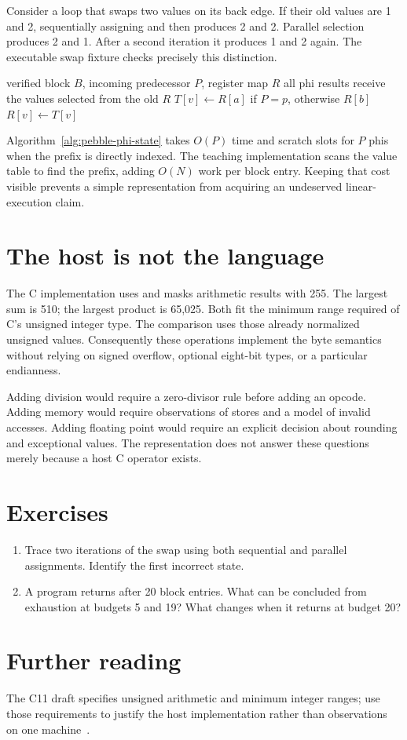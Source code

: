 Consider a loop that swaps two values on its back edge.
If their old values are 1 and 2, sequentially assigning  and then  produces 2 and 2.
Parallel selection produces 2 and 1.
After a second iteration it produces 1 and 2 again.
The executable swap fixture checks precisely this distinction.

\begin{algorithm}[htbp]
\caption{Evaluating a block's phi prefix.}
\label{alg:pebble-phi-state}
\begin{pseudocode}
\Require verified block $B$, incoming predecessor $P$, register map $R$
\Ensure all phi results receive the values selected from the old $R$
\State $T[v]\gets R[a]$ if $P=p$, otherwise $R[b]$
\EndFor
{}
\State $R[v]\gets T[v]$
\EndFor
\end{pseudocode}
\end{algorithm}

Algorithm~\ref{alg:pebble-phi-state} takes $O(P)$ time and scratch slots for $P$ phis when the prefix is directly indexed.
The teaching implementation scans the value table to find the prefix, adding $O(N)$ work per block entry.
Keeping that cost visible prevents a simple representation from acquiring an undeserved linear-execution claim.

\section{The host is not the language}
\label{sec:pebble-host}
The C implementation uses  and masks arithmetic results with 255.
The largest sum is 510; the largest product is 65,025.
Both fit the minimum range required of C's unsigned integer type.
The comparison uses those already normalized unsigned values.
Consequently these operations implement the byte semantics without relying on signed overflow, optional eight-bit types, or a particular endianness.

Adding division would require a zero-divisor rule before adding an opcode.
Adding memory would require observations of stores and a model of invalid accesses.
Adding floating point would require an explicit decision about rounding and exceptional values.
The representation does not answer these questions merely because a host C operator exists.

\section{Exercises}
\label{sec:pebble-two-exercises}
\begin{enumerate}
\item \label{ex:pebble-swap} Trace two iterations of the swap using both sequential and parallel assignments. Identify the first incorrect state.
\item \label{ex:pebble-fuel} A program returns after 20 block entries. What can be concluded from exhaustion at budgets 5 and 19? What changes when it returns at budget 20?
\end{enumerate}

\section{Further reading}
\label{sec:pebble-two-reading}
The C11 draft specifies unsigned arithmetic and minimum integer ranges; use those requirements to justify the host implementation rather than observations on one machine~\cite[Sections~5.2.4.2.1 and~6.2.5]{wg14-2011-c11}.
